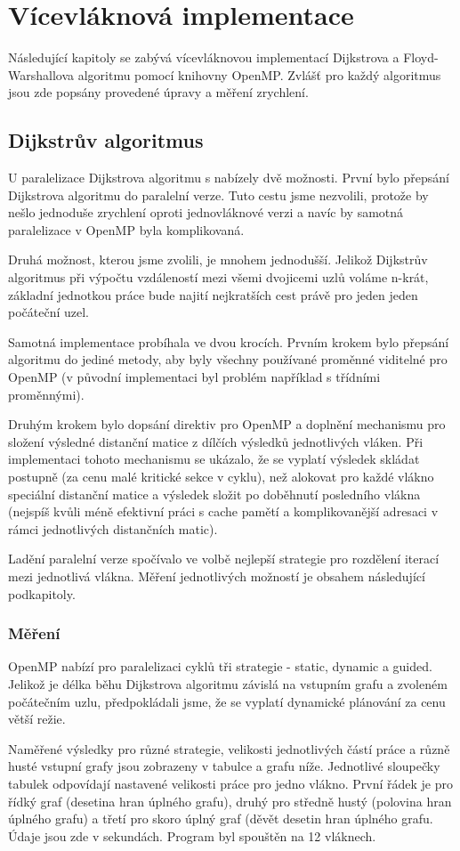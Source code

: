 \documentclass[a4paper,11pt]{article}
\begin{document}
\section{Vícevláknová implementace}
Následující kapitoly se zabývá vícevláknovou implementací Dijkstrova a Floyd-Warshallova algoritmu pomocí knihovny OpenMP. Zvlášť pro každý algoritmus jsou zde popsány provedené úpravy a měření zrychlení.
\subsection{Dijkstrův algoritmus}
U paralelizace Dijkstrova algoritmu s nabízely dvě možnosti. První bylo přepsání Dijkstrova algoritmu do paralelní verze. Tuto cestu jsme nezvolili, protože by nešlo jednoduše zrychlení oproti jednovláknové verzi a navíc by samotná paralelizace v OpenMP byla komplikovaná.
\par
Druhá možnost, kterou jsme zvolili, je mnohem jednodušší. Jelikož Dijk\-strův algoritmus při výpočtu vzdáleností mezi všemi dvojicemi uzlů voláme n-krát, základní jednotkou práce bude najití nejkratších cest právě pro jeden jeden počáteční uzel.
\par
Samotná implementace probíhala ve dvou krocích. Prvním krokem bylo přepsání algoritmu do jediné metody, aby byly všechny používané proměnné viditelné pro OpenMP (v původní implementaci byl problém například s třídními proměnnými).
\par
Druhým krokem bylo dopsání direktiv pro OpenMP a doplnění mechanismu pro složení výsledné distanční matice z dílčích výsledků jednotlivých vláken. Při implementaci tohoto mechanismu se ukázalo, že se vyplatí výsledek skládat postupně (za cenu malé kritické sekce v cyklu), než alokovat pro každé vlákno speciální distanční matice a výsledek složit po doběhnutí posledního vlákna (nejspíš kvůli méně efektivní práci s cache pamětí a komplikovanější adresaci v rámci jednotlivých distančních matic). 
\par
Ladění paralelní verze spočívalo ve volbě nejlepší strategie pro rozdělení iterací mezi jednotlivá vlákna. Měření jednotlivých možností je obsahem následující podkapitoly.

\subsubsection{Měření}
OpenMP nabízí pro paralelizaci cyklů tři strategie - static, dynamic a guided. Jelikož je délka běhu Dijkstrova algoritmu závislá na vstupním grafu a zvoleném počátečním uzlu, předpokládali jsme, že se vyplatí dynamické plánování za cenu větší režie.
\par
Naměřené výsledky pro různé strategie, velikosti jednotlivých částí práce a různě husté vstupní grafy jsou zobrazeny v tabulce a grafu níže. Jednotlivé sloupečky tabulek odpovídají nastavené velikosti práce pro jedno vlákno. První řádek je pro řídký graf (desetina hran úplného grafu), druhý pro středně hustý (polovina hran úplného grafu) a třetí pro skoro úplný graf (děvět desetin hran úplného grafu. Údaje jsou zde v sekundách. Program byl spouštěn na 12 vláknech.
\end{document}
